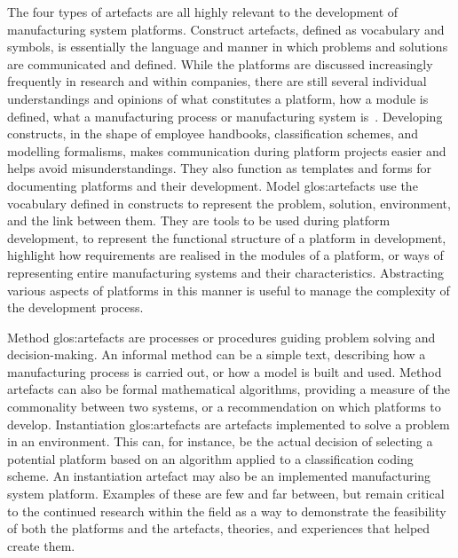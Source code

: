 The four types of artefacts are all highly relevant to the development of manufacturing system platforms.
Construct artefacts, defined as vocabulary and symbols, is essentially the language and manner in which problems and solutions are communicated and defined.
While the platforms are discussed increasingly frequently in research and within companies, there are still several individual understandings and opinions of \eg{} what constitutes a platform, how a module is defined, what a manufacturing process or manufacturing system is~\parencite{SorensenMCPC2017,SorensenAPMS2018}.
Developing constructs, \eg{} in the shape of employee handbooks, classification schemes, and modelling formalisms, makes communication during platform projects easier and helps avoid misunderstandings.
They also function as templates and forms for documenting platforms and their development.
Model \gls{glos:artefact}s use the vocabulary defined in constructs to represent the problem, solution, environment, and the link between them.
They are tools to be used during platform development, \eg{} to represent the functional structure of a platform in development, highlight how requirements are realised in the modules of a platform, or ways of representing entire manufacturing systems and their characteristics.
Abstracting various aspects of platforms in this manner is useful to manage the complexity of the development process.

Method \gls{glos:artefact}s are processes or procedures guiding problem solving and decision-making.
An informal method can be a simple text, describing how a manufacturing process is carried out, or how a model is built and used.
Method artefacts can also be formal mathematical algorithms, \eg{} providing a measure of the commonality between two systems, or a recommendation on which platforms to develop.
Instantiation \gls{glos:artefact}s are artefacts implemented to solve a problem in an environment.
This can, for instance, be the actual decision of selecting a potential platform based on an algorithm applied to a classification coding scheme.
An instantiation artefact may also be an implemented manufacturing system platform.
Examples of these are few and far between, but remain critical to the continued research within the field as a way to demonstrate the feasibility of both the platforms and the artefacts, theories, and experiences that helped create them.

